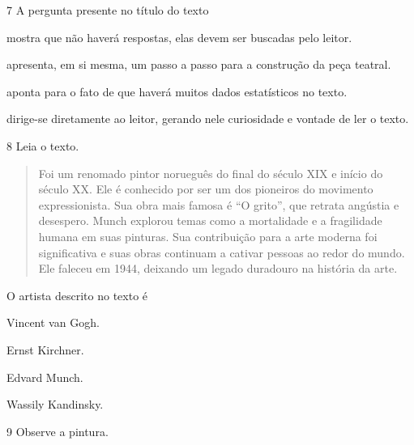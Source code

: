 \num{7} A pergunta presente no título do texto

\begin{escolha}
\item mostra que não haverá respostas, elas devem ser buscadas pelo
leitor.

\item apresenta, em si mesma, um passo a passo para a construção da peça
teatral.

\item aponta para o fato de que haverá muitos dados estatísticos no texto.

\item dirige-se diretamente ao leitor, gerando nele curiosidade e vontade
de ler o texto.
\end{escolha}

\num{8} Leia o texto.

\begin{quote}
Foi um renomado pintor norueguês do final do século XIX e início do século XX. 
Ele é conhecido por ser um dos pioneiros do movimento expressionista. Sua obra 
mais famosa é ``O grito'', que retrata angústia e desespero. Munch explorou temas 
como a mortalidade e a fragilidade humana em suas pinturas. Sua contribuição para 
a arte moderna foi significativa e suas obras continuam a cativar pessoas ao redor 
do mundo. Ele faleceu em 1944, deixando um legado duradouro na história da arte.

\end{quote}

\pagebreak
O artista descrito no texto é

\begin{escolha}
\item
  Vincent van Gogh.
\item
  Ernst Kirchner.
\item
  Edvard Munch.
\item
  Wassily Kandinsky.
\end{escolha}




\num{9} Observe a pintura.

